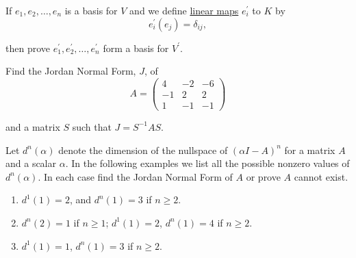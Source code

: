   \begin{exercise} 
    If $e_1, e_2, \ldots, e_n$ is a basis for $V$ and we define \hyperref[def:linear_map]{linear maps} $e_i^\prime$ to $K$ by
    \begin{equation}
      e_i^\prime(e_j) = \delta_{ij},
    \end{equation}
    
    then prove $e_1^\prime, e_2^\prime, \ldots, e_n^\prime$ form a basis for $V^\prime$.
  \end{exercise}

  \begin{exercise} 
    Find the Jordan Normal Form, $J$, of
    \begin{equation}
      A = \begin{pmatrix}
            4 & -2 & -6 \\
            -1 & 2 & 2 \\
            1 & -1 & -1
          \end{pmatrix}
    \end{equation}
    
    and a matrix $S$ such that $J = S^{-1}AS$.
  \end{exercise}

  \begin{exercise} 
    Let $d^n(\alpha)$ denote the dimension of the nullspace of $(\alpha I - A)^n$ for a matrix $A$ and a scalar $\alpha$. In the following examples we list all the possible nonzero values of $d^n(\alpha)$. In each case find the Jordan Normal Form of $A$ or prove $A$ cannot exist.
    \begin{enumerate}
      \item $d^1(1) = 2$, and $d^n(1) = 3$ if $n \geq 2$.
      \item $d^n(2) = 1$ if $n \geq 1$; $d^1(1) = 2$, $d^n(1) = 4$ if $n \geq 2$.
      \item $d^1(1) = 1$, $d^n(1) = 3$ if $n \geq 2$.
    \end{enumerate}
  \end{exercise}

